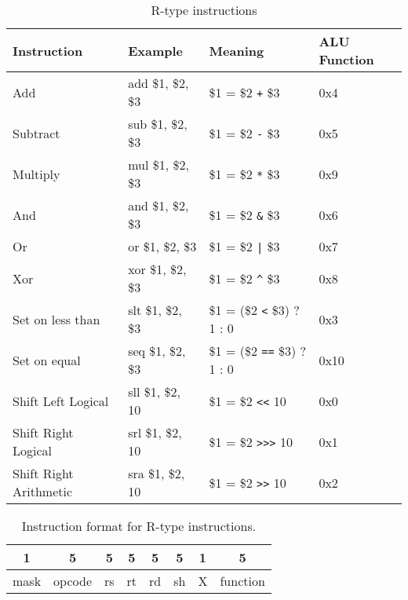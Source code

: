 \documentclass[../main/report.tex]{subfiles}
\begin{document}
\begin{table}[H]
    \begin{tabular}{llll}
    \textbf{Instruction}   & \textbf{Example}  & \textbf{Meaning}          & \textbf{ALU Function} \\
    \hline
    \hline
    Add                    & add \$1, \$2, \$3 & \$1 = \$2 \verb/+/ \$3    & 0x4          \\
    Subtract               & sub \$1, \$2, \$3 & \$1 = \$2 \verb/-/ \$3    & 0x5          \\
    Multiply               & mul \$1, \$2, \$3 & \$1 = \$2 \verb/*/ \$3    & 0x9          \\ \hline
    And                    & and \$1, \$2, \$3 & \$1 = \$2 \verb/&/ \$3    & 0x6          \\
    Or                     & or \$1, \$2, \$3  & \$1 = \$2 \verb/|/ \$3    & 0x7          \\
    Xor                    & xor \$1, \$2, \$3 & \$1 = \$2 \verb/^/ \$3    & 0x8          \\ \hline
    Set on less than       & slt \$1, \$2, \$3 & \$1 = (\$2 \verb/</ \$3) ? 1 : 0 & 0x3   \\
    Set on equal           & seq \$1, \$2, \$3 & \$1 = (\$2 \verb/==/ \$3) ? 1 : 0 & 0x10 \\ \hline
    Shift Left Logical     & sll \$1, \$2, 10  & \$1 = \$2 \verb/<</ 10    & 0x0          \\
    Shift Right Logical    & srl \$1, \$2, 10  & \$1 = \$2 \verb/>>>/ 10   & 0x1          \\
    Shift Right Arithmetic & sra \$1, \$2, 10  & \$1 = \$2 \verb/>>/ 10    & 0x2          \\
    \end{tabular}
    \caption{R-type instructions}
    \label{table:r_type_instructions}
\end{table}

\begin{table}[H]
    \centering
    \begin{tabular}{|c|c|c|c|c|c|c|c|}
    \multicolumn{1}{c}{1} & \multicolumn{1}{c}{5} & \multicolumn{1}{c}{5}  & \multicolumn{1}{c}{5}  & \multicolumn{1}{c}{5} & \multicolumn{1}{c}{5} & \multicolumn{1}{c}{1} & \multicolumn{1}{c}{5}    \\ \hline
    mask & opcode & rs & rt & rd & sh & X & function \\ \hline
    \end{tabular}
    \caption{Instruction format for R-type instructions.}
    \label{table:r_type_format}
\end{table}
\end{document}
